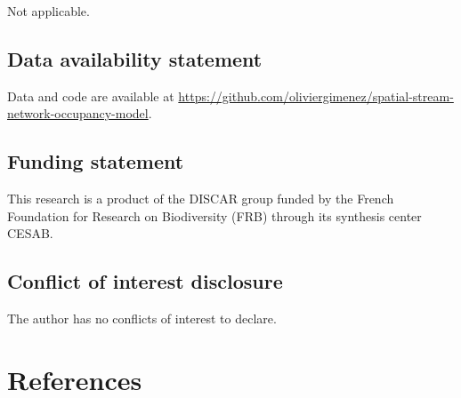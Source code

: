\documentclass[
  11pt,
  a4paper,
]{article}
\begin{document}
Not applicable.

\subsection{Data availability statement}\label{data-availability-statement}

Data and code are available at \href{https://github.com/oliviergimenez/spatial-stream-network-occupancy-model}{https://github.com/oliviergimenez/spatial-stream-network-occupancy-model}.

\subsection{Funding statement}\label{funding-statement}

This research is a product of the DISCAR group funded by the French Foundation for Research on Biodiversity (FRB) through its synthesis center CESAB.

\subsection{Conflict of interest disclosure}\label{conflict-of-interest-disclosure}

The author has no conflicts of interest to declare.

\section{References}\label{references}
\end{document}
